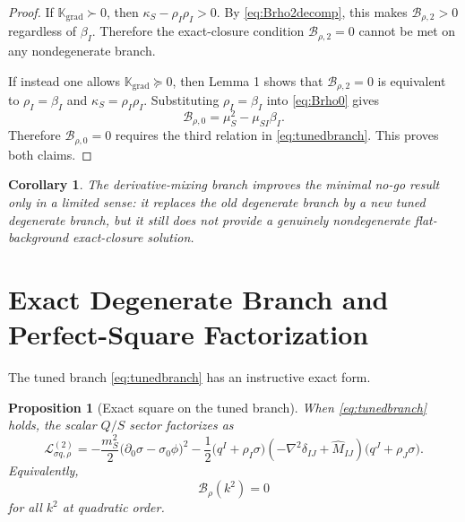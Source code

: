 \documentclass[11pt]{article}
\newtheorem{proposition}{Proposition}
\newtheorem{corollary}{Corollary}
\begin{document}
\begin{proof}
If \(\mathbb K_{\mathrm{grad}}\succ 0\), then \(\kappa_S-\rho_I\rho_I>0\). By \eqref{eq:Brho2decomp}, this makes \(\mathcal B_{\rho,2}>0\) regardless of \(\beta_I\). Therefore the exact-closure condition \(\mathcal B_{\rho,2}=0\) cannot be met on any nondegenerate branch.

If instead one allows \(\mathbb K_{\mathrm{grad}}\succeq 0\), then Lemma 1 shows that \(\mathcal B_{\rho,2}=0\) is equivalent to \(\rho_I=\beta_I\) and \(\kappa_S=\rho_I\rho_I\). Substituting \(\rho_I=\beta_I\) into \eqref{eq:Brho0} gives
\[
\mathcal B_{\rho,0}
=
\mu_S^2-\mu_{SI}\beta_I.
\]
Therefore \(\mathcal B_{\rho,0}=0\) requires the third relation in \eqref{eq:tunedbranch}. This proves both claims.
\end{proof}

\begin{corollary}
The derivative-mixing branch improves the minimal no-go result only in a limited sense: it replaces the old degenerate branch by a new tuned degenerate branch, but it still does not provide a genuinely nondegenerate flat-background exact-closure solution.
\end{corollary}

\section{Exact Degenerate Branch and Perfect-Square Factorization}

The tuned branch \eqref{eq:tunedbranch} has an instructive exact form.

\begin{proposition}[Exact square on the tuned branch]
When \eqref{eq:tunedbranch} holds, the scalar \(Q/S\) sector factorizes as
\begin{equation}
\mathcal L_{\sigma q,\rho}^{(2)}
=
-\frac{m_S^2}{2}\bigl(\partial_0\sigma-\sigma_0\phi\bigr)^2
-\frac{1}{2}
\bigl(q^I+\rho_I\sigma\bigr)
\left(-\nabla^2\delta_{IJ}+\widehat M_{IJ}\right)
\bigl(q^J+\rho_J\sigma\bigr).
\label{eq:perfectsquare}
\end{equation}
Equivalently,
\begin{equation}
\mathcal B_{\rho}(k^2)=0
\label{eq:Brhozero}
\end{equation}
for all \(k^2\) at quadratic order.
\end{proposition}
\end{document}
